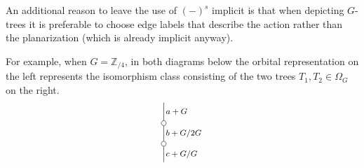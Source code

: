\documentclass[a4paper,10pt]{article}%
\begin{document}
\begin{example}
  An additional reason to leave the use of $(\minus)^s$ implicit
  is that when depicting $G$-trees it is preferable to choose edge labels that describe the action rather than the planarization (which is already implicit anyway).

  For example, when $G = \mathbb{Z}_{/4}$, in both diagrams below the orbital representation on the left represents the isomorphism class consisting of the two trees $T_1,T_2 \in \Omega_G$ on the right.
  \[
  \begin{tikzpicture}[grow=up,auto,level distance=2.1em,
    every node/.style = {font=\footnotesize,inner sep=2pt},
    dummy/.style={circle,draw,inner sep=0pt,minimum size=1.75mm}]
    \node at (-1,0) {}
    child{node [dummy] {}
      child{node [dummy] {}
        child{
          edge from parent node [swap] {$a+G$}}
        edge from parent node [swap] {$b+G/2G$}}
      edge from parent node [swap] {$c + G/G$}};


\end{tikzpicture}\]
\end{example}
\end{document}
